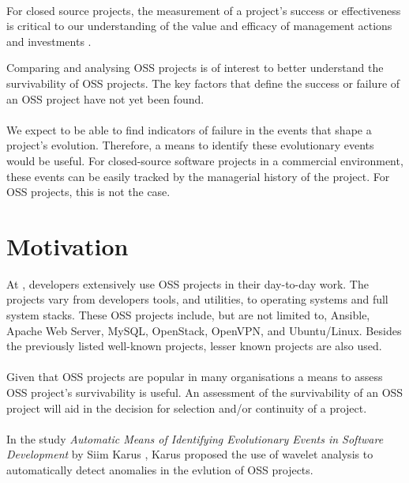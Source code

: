 \paragraph{}
For closed source projects, the measurement of a project's success or
effectiveness is critical to our understanding of the value and efficacy of
management actions and investments \cite{delone2003}.

Comparing and analysing OSS projects is of interest to better understand the
survivability of OSS projects. The key factors that define the success or
failure of an OSS project have not yet been found.

\paragraph{}
We expect to be able to find indicators of failure in the events that
shape a project's evolution. Therefore, a means to identify these evolutionary
events would be useful. For closed-source software projects in a commercial
environment, these events can be easily tracked by the managerial history of
the project. For OSS projects, this is not the case.



\section{Motivation}
At \hostOrg, developers extensively use OSS projects in their day-to-day
work. The projects vary from developers tools, and utilities, to operating
systems and full system stacks. These OSS projects include, but are not limited
to, Ansible, Apache Web Server, MySQL, OpenStack, OpenVPN, and Ubuntu/Linux.
Besides the previously listed well-known projects, lesser known projects are
also used.

\paragraph{}
Given that OSS projects are popular in many organisations a means to assess OSS
project's survivability is useful. An assessment of the survivability of an OSS
project will aid in the decision for selection and/or continuity of a project.

\paragraph{}
In the study \emph{Automatic Means of Identifying Evolutionary Events in
Software Development }\rm by Siim Karus \cite{karus2013}, Karus proposed the
use of wavelet analysis to automatically detect anomalies in the evlution of
OSS projects.

